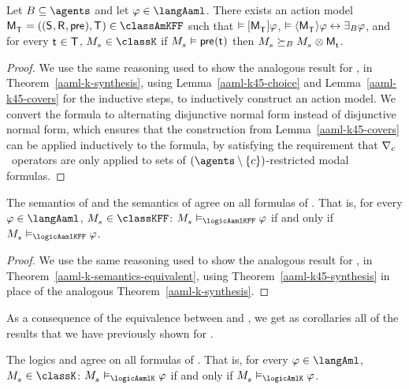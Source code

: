 \begin{theorem}\label{aaml-k45-synthesis}
Let $\agentsB \subseteq \agents$ and let $\phi \in \langAaml$.
There exists an action model $\aPModelAndTuple{\aStatesT} \in \classAmKFF$ such that 
$\entails \actionA{\aPModel{\aStatesT}} \phi$,
$\entails \actionE{\aPModel{\aStatesT}} \phi \iff \someactsBs \phi$, and
for every $\aStateT \in \aStatesT$, $\kPModel{\kStateS} \in \classK$ if $\kPModel{\kStateS} \entails \aPrecondition(\aStateT)$ then $\kPModel{\kStateS} \simulatesBs \kPModel{\kStateS} \exec \aPModel{\aStateT}$.
\end{theorem}

\begin{proof}[Proof]
We use the same reasoning used to show the analogous result for \logicAamlK{}, in Theorem~\ref{aaml-k-synthesis}, using Lemma~\ref{aaml-k45-choice} and Lemma~\ref{aaml-k45-covers} for the inductive steps, to inductively construct an action model.
We convert the formula to alternating disjunctive normal form instead of disjunctive normal form, which ensures that the construction from Lemma~\ref{aaml-k45-covers} can be applied inductively to the formula, by satisfying the requirement that $\nabla_{c}$~operators are only applied to sets of $(\agents \setminus \{\agentC\})$-restricted modal formulas.
\end{proof}

\begin{theorem}\label{aaml-k45-semantics-equivalent}
The semantics of \logicAamlKFF{} and the semantics of \logicRamlKFF{} agree on all formulas of \langAaml{}.
That is, for every $\phi \in \langAaml$, $\kPModel{\kStateS} \in \classKFF$: $\kPModel{\kStateS} \entails_\logicAamlKFF \phi$ if and only if $\kPModel{\kStateS} \entails_\logicAamlKFF \phi$.
\end{theorem}

\begin{proof}
We use the same reasoning used to show the analogous result for \logicAamlK{}, in Theorem~\ref{aaml-k-semantics-equivalent}, using Theorem~\ref{aaml-k45-synthesis} in place of the analogous Theorem~\ref{aaml-k-synthesis}.
\end{proof}

As a consequence of the equivalence between \logicAamlKFF{} and \logicRamlKFF{}, we get as corollaries all of the results that we have previously shown for \logicRamlKFF{}.

\begin{corollary}
The logics \logicAamlKFF{} and \logicAmlKFF{} agree on all formulas of \langAml{}.
That is, for every $\phi \in \langAml$, $\kPModel{\kStateS} \in \classK$: $\kPModel{\kStateS} \entails_\logicAamlK \phi$ if and only if $\kPModel{\kStateS} \entails_\logicAmlK \phi$.
\end{corollary}

